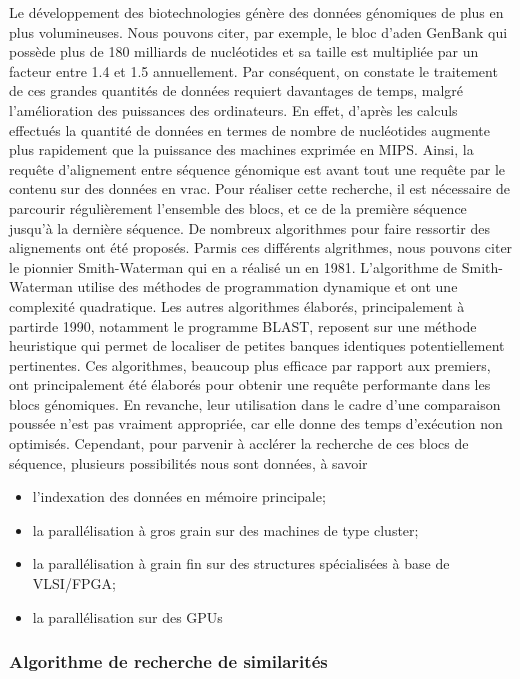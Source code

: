 Le développement des biotechnologies génère des
données génomiques de plus en plus volumineuses.
Nous pouvons citer, par exemple, le bloc d'aden GenBank
qui possède plus de 180 milliards de nucléotides et sa
taille est multipliée par un facteur entre 1.4 et 1.5
annuellement. Par conséquent, on constate le traitement
de ces grandes quantités de données requiert davantages
de temps, malgré l'amélioration des puissances des
ordinateurs. En effet, d'après les calculs effectués
la quantité de données en termes de nombre de
nucléotides augmente plus rapidement que la puissance
des machines exprimée en MIPS.
Ainsi, la requête d'alignement entre séquence génomique
est avant tout une requête par le contenu sur des
données en vrac. Pour réaliser cette recherche, il est
nécessaire de parcourir régulièrement l'ensemble
des blocs, et ce de la première séquence jusqu'à la
dernière séquence. De nombreux algorithmes pour faire
ressortir des alignements ont été proposés. Parmis ces
différents algrithmes, nous pouvons citer le pionnier
Smith-Waterman qui en a réalisé un en 1981.
L'algorithme de Smith-Waterman utilise des méthodes
de programmation dynamique et ont une complexité
quadratique. Les autres algorithmes élaborés,
principalement à partirde 1990, notamment le
programme BLAST, reposent sur une méthode heuristique
qui permet de localiser de petites banques identiques
potentiellement pertinentes. Ces algorithmes, beaucoup
plus efficace par rapport aux premiers, ont
principalement été élaborés pour obtenir une requête
performante dans les blocs génomiques. En revanche,
leur utilisation dans le cadre d'une comparaison
poussée n'est pas vraiment appropriée, car elle donne
des temps d'exécution non optimisés.
Cependant, pour parvenir à acclérer la recherche
de ces blocs de séquence, plusieurs possibilités nous sont
données, à savoir

\begin{itemize}
\item l'indexation des données en mémoire principale;
\item la parallélisation à gros grain sur des
machines de type cluster;
\item la parallélisation à grain fin sur des
structures spécialisées à base de VLSI/FPGA;
\item la parallélisation sur des GPUs
\end{itemize}

\subsubsection{Algorithme de recherche de similarités}

